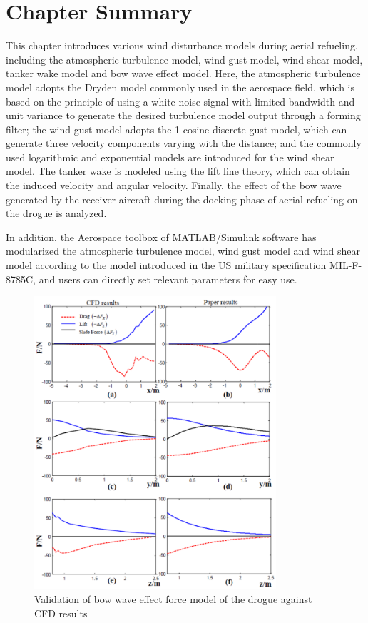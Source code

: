\section{Chapter Summary}
This chapter introduces various wind disturbance models during aerial refueling, including the atmospheric turbulence model, wind gust model, wind shear model, tanker wake model and bow wave effect model. Here, the atmospheric turbulence model adopts the Dryden model commonly used in the aerospace field, which is based on the principle of using a white noise signal with limited bandwidth and unit variance to generate the desired turbulence model output through a forming filter; the wind gust model adopts the 1-cosine discrete gust model, which can generate three velocity components varying with the distance; and the commonly used logarithmic and exponential models are introduced for the wind shear model. The tanker wake is modeled using the lift line theory, which can obtain the induced velocity and angular velocity. Finally, the effect of the bow wave generated by the receiver aircraft during the docking phase of aerial refueling on the drogue is analyzed.

In addition, the Aerospace toolbox of MATLAB/Simulink software has modularized the atmospheric turbulence model, wind gust model and wind shear model according to the model introduced in the US military specification MIL-F-8785C, and users can directly set relevant parameters for easy use.\clearpage
\begin{figure}[th]
	\centering
	\includegraphics[width=0.8\textwidth]{Figures/Figs_Ch4/fig12.pdf}
	\caption{Validation of bow wave effect force model of the drogue against CFD results}\label{fig12}
\end{figure}
\clearpage


